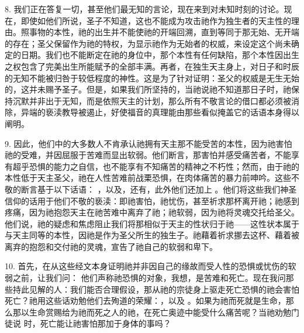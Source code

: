 8. 我们正在答复一切，甚至他们最无知的言论，现在来到对未知时刻的讨论。现在，即使如他们所说，圣子不知道，这也不能成为攻击祂作为独生者的天主性的理由。照事物的本性，祂的出生并不能使祂的开端回溯，直到等同于那无始、无开端的存在；圣父保留作为祂的特权，为显示祂作为无始者的权威，来设定这个尚未确定的日期。我们也不能断定在祂的身位中，那个本性有任何缺陷，那个本性因出生之权包含了完美出生所能赋予的全部丰满。再者，在独生天主身上，对日子和时辰的无知不能被归咎于较低程度的神性。这是为了针对证明：圣父的权威是无生无始的，这并未赐予圣子。但是，如果我们所坚持的，当祂说祂不知道那日子时，祂保持沉默并非出于无知，而是依照天主的计划，那么所有不敬言论的借口都必须被消除，异端的亵渎教导被遏止，好使福音的真理能由那些看似掩盖它的话语本身得以阐明。\par

9. 因此，他们中的大多数人不肯承认祂拥有天主那不能受苦的本性，因为祂害怕祂的受难，并因屈服于苦难而显出软弱。他们断言，那害怕并感受痛苦者，不能享有超乎恐惧的能力之自信，也不能享有不知痛苦的精神之不朽性；然而，由于祂的本性低于天主圣父，祂在人性苦难前战栗恐惧，在肉体痛苦的暴力前呻吟。这些不敬的断言基于以下话语： ，以及，还有，此外他们还加上 。他们将这些我们神圣信仰的话用于他们不敬的亵渎：即祂害怕，祂忧伤，甚至祈求那杯离开祂；祂感到疼痛，因为祂抱怨天主在祂苦难中离弃了祂；祂软弱，因为祂将灵魂交托给圣父。他们说，祂的疑虑和焦虑阻止我们将那相似于天主的性状归于祂——这性状本属于与天主同等的本性，因祂是作为圣父所生的独生子。祂藉着祈求挪去这杯、藉着被离弃的抱怨和交付祂的灵魂，宣告了祂自己的软弱和卑下。\par

10. 首先，在从这些经文本身证明祂并非因自己的缘故而受人性的恐惧或忧伤的软弱之前，让我们问： 他们声称祂恐惧的对象，我想，是苦难和死亡。现在我问那些持此见解的人：我们能否合理假设，那从祂的宗徒身上驱走死亡恐惧的祂会害怕死亡？祂用这些话劝勉他们去殉道的荣耀：，以及 。如果为祂而死就是生命，那么那以生命赏赐给为祂而死之人的祂，在死亡奥迹中能受什么痛苦呢？当祂劝勉门徒说 时，死亡能让祂害怕那加于身体的事吗？\par

